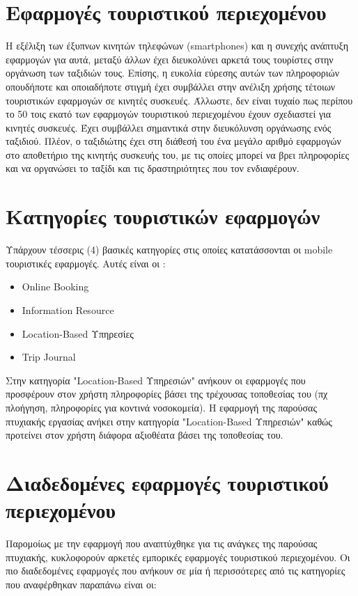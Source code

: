 \documentclass[oneside, 12pt]{book}
\begin{document}
\section{Εφαρμογές τουριστικού περιεχομένου}
Η εξέλιξη των έξυπνων κινητών τηλεφώνων (smartphones) και η συνεχής ανάπτυξη εφαρμογών για αυτά, 
μεταξύ άλλων έχει διευκολύνει αρκετά τους τουρίστες στην οργάνωση των ταξιδιών τους.
Επίσης, η ευκολία εύρεσης αυτών των πληροφοριών οπουδήποτε και οποιαδήποτε στιγμή έχει συμβάλλει στην ανέλιξη χρήσης τέτοιων τουριστικών εφαρμογών σε κινητές συσκευές.
Άλλωστε, δεν είναι τυχαίο πως περίπου το 50 τοις εκατό των εφαρμογών τουριστικού περιεχομένου έχουν σχεδιαστεί για κινητές συσκευές.
Έχει συμβάλλει σημαντικά στην διευκόλυνση οργάνωσης ενός ταξιδιού. 
Πλέον, ο ταξιδιώτης έχει στη διάθεσή του ένα μεγάλο αριθμό εφαρμογών στο αποθετήριο της κινητής συσκευής του, 
με τις οποίες μπορεί να βρει πληροφορίες και να οργανώσει το ταξίδι και τις δραστηριότητες που τον ενδιαφέρουν.

\section{Κατηγορίες τουριστικών εφαρμογών}
Υπάρχουν τέσσερις (4) βασικές κατηγορίες στις οποίες κατατάσσονται οι mobile τουριστικές εφαρμογές. 
Αυτές είναι οι :
\begin{itemize}
    \item Online Booking
    \item Information Resource
    \item Location-Based Υπηρεσίες
    \item Trip Journal
\end{itemize}
Στην κατηγορία "Location-Based Υπηρεσιών" ανήκουν οι εφαρμογές 
που προσφέρουν στον χρήστη πληροφορίες βάσει της τρέχουσας τοποθεσίας 
του (πχ πλοήγηση, πληροφορίες για κοντινά νοσοκομεία).
\cite{smirnov2014mobile}
Η εφαρμογή της παρούσας πτυχιακής εργασίας ανήκει στην κατηγορία 
"Location-Based Υπηρεσιών" καθώς προτείνει στον χρήστη διάφορα 
αξιοθέατα βάσει της τοποθεσίας του.

\section{Διαδεδομένες εφαρμογές τουριστικού περιεχομένου}
Παρομοίως με την εφαρμογή που αναπτύχθηκε για τις ανάγκες της παρούσας πτυχιακής, 
κυκλοφορούν αρκετές εμπορικές εφαρμογές τουριστικού περιεχομένου.
Οι πιο διαδεδομένες εφαρμογές που ανήκουν σε μία ή περισσότερες από τις κατηγορίες που αναφέρθηκαν παραπάνω είναι οι:
\end{document}
